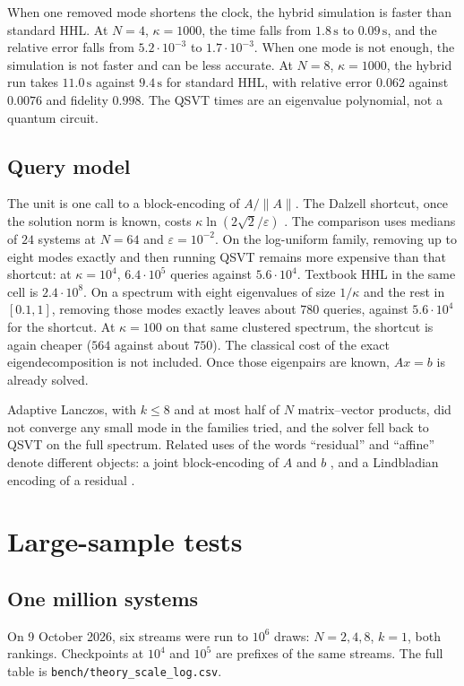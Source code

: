 \documentclass[11pt,a4paper]{article}
\begin{document}
When one removed mode shortens the clock, the hybrid simulation is faster than standard HHL.
At \(N=4\), \(\kappa=1000\), the time falls from \(1.8\,\mathrm{s}\) to \(0.09\,\mathrm{s}\), and the relative error falls from \(5.2\cdot 10^{-3}\) to \(1.7\cdot 10^{-3}\).
When one mode is not enough, the simulation is not faster and can be less accurate.
At \(N=8\), \(\kappa=1000\), the hybrid run takes \(11.0\,\mathrm{s}\) against \(9.4\,\mathrm{s}\) for standard HHL, with relative error \(0.062\) against \(0.0076\) and fidelity \(0.998\).
The QSVT times are an eigenvalue polynomial, not a quantum circuit.

\subsection{Query model}
The unit is one call to a block-encoding of \(A/\lVert A\rVert\).
The Dalzell shortcut, once the solution norm is known, costs \(\kappa\ln(2\sqrt{2}/\varepsilon)\) \citep{dalzell2024}.
The comparison uses medians of \(24\) systems at \(N=64\) and \(\varepsilon=10^{-2}\).
On the log-uniform family, removing up to eight modes exactly and then running QSVT remains more expensive than that shortcut: at \(\kappa=10^{4}\), \(6.4\cdot 10^{5}\) queries against \(5.6\cdot 10^{4}\).
Textbook HHL in the same cell is \(2.4\cdot 10^{8}\).
On a spectrum with eight eigenvalues of size \(1/\kappa\) and the rest in \([0.1,1]\), removing those modes exactly leaves about \(780\) queries, against \(5.6\cdot 10^{4}\) for the shortcut.
At \(\kappa=100\) on that same clustered spectrum, the shortcut is again cheaper (\(564\) against about \(750\)).
The classical cost of the exact eigendecomposition is not included.
Once those eigenpairs are known, \(Ax=b\) is already solved.

Adaptive Lanczos, with \(k\le 8\) and at most half of \(N\) matrix--vector products, did not converge any small mode in the families tried, and the solver fell back to QSVT on the full spectrum.
Related uses of the words ``residual'' and ``affine'' denote different objects: a joint block-encoding of \(A\) and \(b\) \citep{li2025,dalzell2026}, and a Lindbladian encoding of a residual \citep{shang2026}.

\section{Large-sample tests}
\label{sec:scale}

\subsection{One million systems}
On 9 October 2026, six streams were run to \(10^{6}\) draws: \(N=2,4,8\), \(k=1\), both rankings.
Checkpoints at \(10^{4}\) and \(10^{5}\) are prefixes of the same streams.
The full table is \texttt{bench/theory\_scale\_log.csv}.
\end{document}
